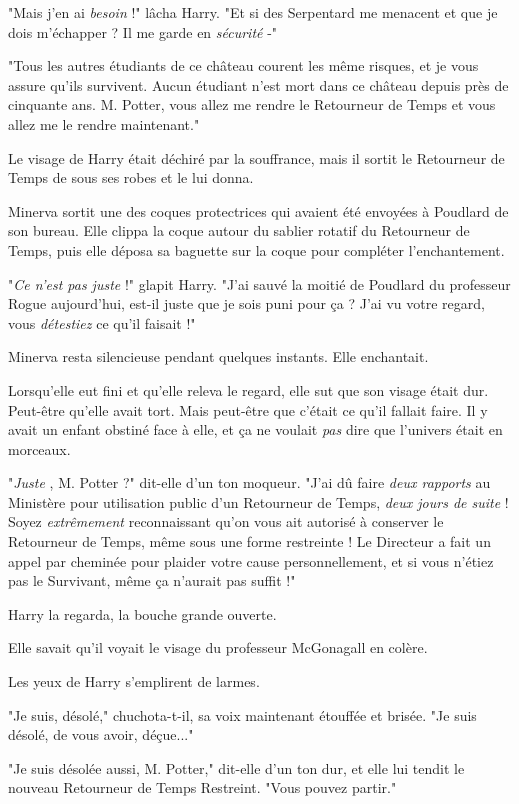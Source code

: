 "Mais j'en ai \emph{besoin}  !" lâcha Harry. "Et si des Serpentard me menacent et que je dois m'échapper ? Il me garde en \emph{sécurité}  -"

"Tous les autres étudiants de ce château courent les même risques, et je vous assure qu'ils survivent. Aucun étudiant n'est mort dans ce château depuis près de cinquante ans. M. Potter, vous allez me rendre le Retourneur de Temps et vous allez me le rendre maintenant."

Le visage de Harry était déchiré par la souffrance, mais il sortit le Retourneur de Temps de sous ses robes et le lui donna.

Minerva sortit une des coques protectrices qui avaient été envoyées à Poudlard de son bureau. Elle clippa la coque autour du sablier rotatif du Retourneur de Temps, puis elle déposa sa baguette sur la coque pour compléter l'enchantement.

"\emph{Ce n'est pas juste}  !" glapit Harry. "J'ai sauvé la moitié de Poudlard du professeur Rogue aujourd'hui, est-il juste que je sois puni pour ça ? J'ai vu votre regard, vous \emph{détestiez}  ce qu'il faisait !"

Minerva resta silencieuse pendant quelques instants. Elle enchantait.

Lorsqu'elle eut fini et qu'elle releva le regard, elle sut que son visage était dur. Peut-être qu'elle avait tort. Mais peut-être que c'était ce qu'il fallait faire. Il y avait un enfant obstiné face à elle, et ça ne voulait \emph{pas}  dire que l'univers était en morceaux.

"\emph{Juste} , M. Potter ?" dit-elle d'un ton moqueur. "J'ai dû faire \emph{deux rapports}  au Ministère pour utilisation public d'un Retourneur de Temps, \emph{deux jours de suite}  ! Soyez \emph{extrêmement}  reconnaissant qu'on vous ait autorisé à conserver le Retourneur de Temps, même sous une forme restreinte ! Le Directeur a fait un appel par cheminée pour plaider votre cause personnellement, et si vous n'étiez pas le Survivant, même ça n'aurait pas suffit !"

Harry la regarda, la bouche grande ouverte.

Elle savait qu'il voyait le visage du professeur McGonagall en colère.

Les yeux de Harry s'emplirent de larmes.

"Je suis, désolé," chuchota-t-il, sa voix maintenant étouffée et brisée. "Je suis désolé, de vous avoir, déçue..."

"Je suis désolée aussi, M. Potter," dit-elle d'un ton dur, et elle lui tendit le nouveau Retourneur de Temps Restreint. "Vous pouvez partir."

